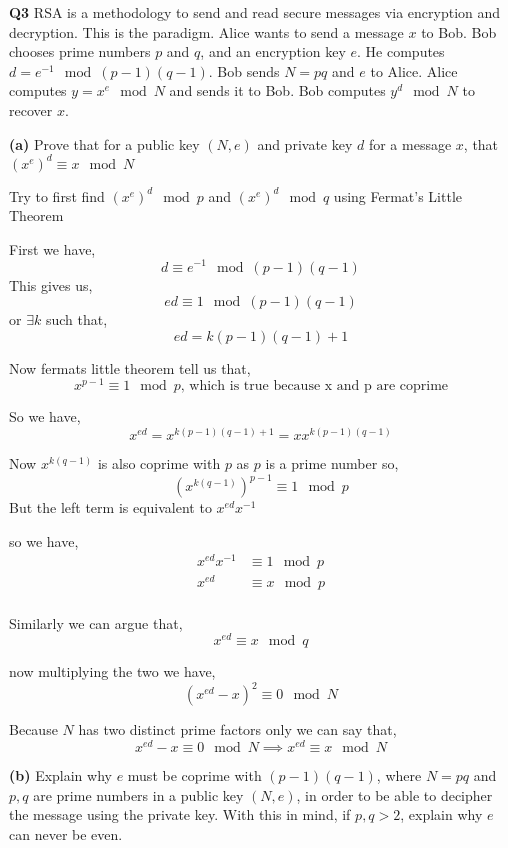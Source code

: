 \documentclass[12pt]{article}
\newcommand{\question}[3][Q]{
\begin{description}
\item \textbf{#1{#2}} #3
\end{description}
}
\newcommand{\hint}[1]{{\footnotesize
    \begin{description}
    [leftmargin=3.3em,style=nextline]
        \item[Hint:] {#1}
    \end{description}}   
}
\begin{document}
\question{3}{RSA is a methodology to send and read secure messages via encryption and decryption. This is the paradigm. Alice wants to send a message $x$ to Bob. Bob chooses prime numbers $p$ and $q$, and an encryption key $e$. He computes $d = e^{-1} \mod (p-1)(q-1)$. Bob sends $N=pq$ and $e$ to Alice. Alice computes $y = x^e \mod N$ and sends it to Bob. Bob computes $y^d \mod N$ to recover $x$.}
\question[]{(a)} {
Prove that for a public key $(N, e)$ and private key $d$ for a message $x$, that $(x^e)^d \equiv x \mod N$

\hint{Try to first find $(x^e)^d \mod p$ and $(x^e)^d \mod q$ using Fermat's Little Theorem}
}
\begin{answer}
    First we have, 
    $$ d \equiv e^{-1} \mod (p-1)(q-1) $$ 
This gives us, 
$$ ed \equiv 1 \mod (p-1)(q-1) $$  or $\exists k$ such that, 
$$ ed = k(p-1)(q-1) + 1 $$ 

Now fermats little theorem tell us that, 
$$ x^{p - 1}  \equiv 1 \mod p \text{, which is true because x and p are coprime}$$ 

So we have, 
$$ x^{ed} = x^{k(p-1)(q-1) + 1} = xx^{k(p-1)(q-1)} $$ 

Now $x^{k(q - 1)}$ is also coprime with $p$ as $p$ is a prime number so, 
$$ (x^{k(q-1)})^{p - 1} \equiv 1 \mod p $$ 
But the left term is equivalent to $x^{ed} x^{-1}$

so we have, 
\begin{align*}
    x^{ed}x^{-1} &\equiv 1 \mod p \\
    x^{ed}&\equiv x \mod p \\
\end{align*}

Similarly we can argue that, 
$$ x^{ed} \equiv x \mod q $$ 


now multiplying the two we have, 
$$ (x^{ed} - x)^2 \equiv 0 \mod N $$ 

Because $N$ has two distinct prime factors only we can say that, 
$$ x^{ed} - x \equiv 0 \mod N \implies x^{ed} \equiv x \mod N$$ 



\end{answer}

\question[]{(b)} {Explain why $e$ must be coprime with $(p - 1)(q -1)$, where $N = pq$ and $p, q$ are prime numbers in a public key $(N, e)$, in order to be able to decipher the message using the private key. With this in mind, if $p, q > 2$, explain why $e$ can never be even.

}
\end{document}
